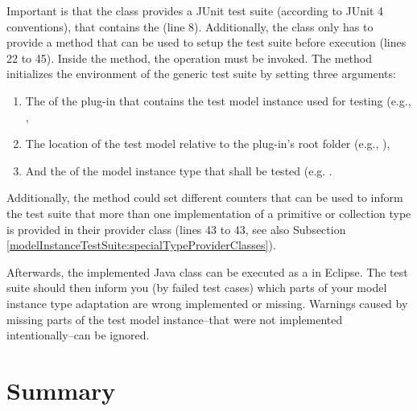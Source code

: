 Important is that the class provides a JUnit test suite (according to JUnit 4 conventions), that contains the  (line 8). Additionally, the class only has to provide a  method that can be used to setup the test suite before execution (lines 22 to 45). Inside the  method, the operation  must be invoked. The method initializes the environment of the generic test suite by setting three arguments:

\begin{enumerate}
	\item The  of the plug-in that contains the test model instance used for testing (e.g., ,
	\item The location of the test model relative to the plug-in's root folder (e.g., ),
	\item And the  of the model instance type that shall be tested (e.g. .
\end{enumerate}

Additionally, the method could set different counters that can be used to inform the test suite that more than one implementation of a primitive or collection type is provided in their provider class (lines 43 to 43, see also Subsection \ref{modelInstanceTestSuite:specialTypeProviderClasses}).

Afterwards, the implemented Java class can be executed as a  in Eclipse. The test suite should then inform you (by failed test cases) which parts of your model instance type adaptation are wrong implemented or missing. Warnings caused by missing parts of the test model instance--that were not implemented intentionally--can be ignored.


\section{Summary}

